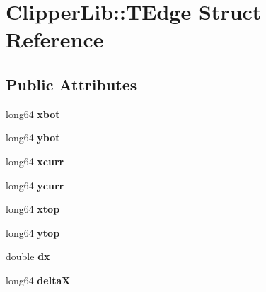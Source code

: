 \hypertarget{structClipperLib_1_1TEdge}{\section{Clipper\-Lib\-:\-:T\-Edge Struct Reference}
\label{structClipperLib_1_1TEdge}
}
\subsection*{Public Attributes}
\begin{DoxyCompactItemize}
\item 
\hypertarget{structClipperLib_1_1TEdge_a42d3306a851df6869a85f68495a1c4a3}{long64 {\bfseries xbot}}\label{structClipperLib_1_1TEdge_a42d3306a851df6869a85f68495a1c4a3}

\item 
\hypertarget{structClipperLib_1_1TEdge_a5cca9ccc325b346dc2a25001c4291f2a}{long64 {\bfseries ybot}}\label{structClipperLib_1_1TEdge_a5cca9ccc325b346dc2a25001c4291f2a}

\item 
\hypertarget{structClipperLib_1_1TEdge_a26717c33477dbe350518cd0819a9e3c6}{long64 {\bfseries xcurr}}\label{structClipperLib_1_1TEdge_a26717c33477dbe350518cd0819a9e3c6}

\item 
\hypertarget{structClipperLib_1_1TEdge_a075c45d9ae5c1d2d0a22a4778c2f7c74}{long64 {\bfseries ycurr}}\label{structClipperLib_1_1TEdge_a075c45d9ae5c1d2d0a22a4778c2f7c74}

\item 
\hypertarget{structClipperLib_1_1TEdge_ad171f585c0d88630f35fc87706ae1fde}{long64 {\bfseries xtop}}\label{structClipperLib_1_1TEdge_ad171f585c0d88630f35fc87706ae1fde}

\item 
\hypertarget{structClipperLib_1_1TEdge_a56b854b6224c1f0fc7903d5448229a3a}{long64 {\bfseries ytop}}\label{structClipperLib_1_1TEdge_a56b854b6224c1f0fc7903d5448229a3a}

\item 
\hypertarget{structClipperLib_1_1TEdge_aab44ea427e3da1631c15e1ff7c913108}{double {\bfseries dx}}\label{structClipperLib_1_1TEdge_aab44ea427e3da1631c15e1ff7c913108}

\item 
\hypertarget{structClipperLib_1_1TEdge_ab27923f96c12e80a3e6c95776333c811}{long64 {\bfseries delta\-X}}\label{structClipperLib_1_1TEdge_ab27923f96c12e80a3e6c95776333c811}


\end{DoxyCompactItemize}
